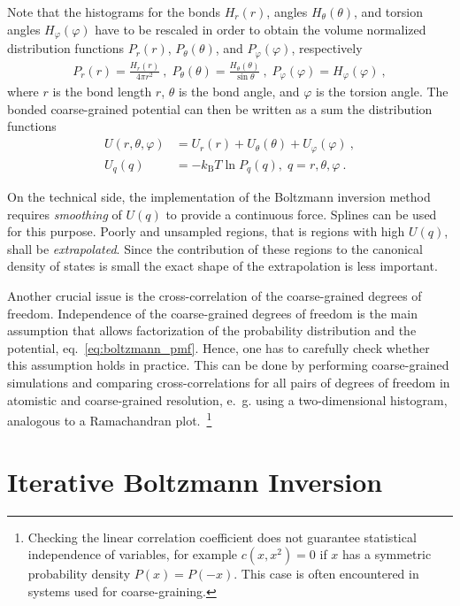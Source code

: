 Note that the histograms for the bonds $H_r(r)$, angles $H_\theta(\theta)$, and torsion angles $H_\varphi(\varphi)$ have to be rescaled in order to obtain the volume normalized distribution functions $P_r(r)$, $P_\theta(\theta)$, and $P_\varphi(\varphi)$, respectively
%
\begin{align}
    P_r(r) = \frac{H_r(r)}{4\pi r^2}~,\;
    P_\theta(\theta) = \frac{H_\theta(\theta)}{\sin \theta}~,\;
    P_\varphi(\varphi) = H_\varphi (\varphi)~,
    \label{eq:boltzmann_norm}
\end{align}
where $r$ is the bond length $r$, $\theta$ is the bond angle, and $\varphi$ is the torsion angle. The bonded coarse-grained potential can then be written as a sum the distribution functions
%
\begin{align}
    \label{eq:boltzmann_pmf}
    U({r}, \theta, \varphi) &= U_r({r}) + U_{\theta}(\theta) + U_{\varphi}(\varphi)~, \\
    U_q({q}) &= - k_\text{B} T \ln P_q( q ),\; q=r, \theta, \varphi~.
    \nonumber
\end{align}

On the technical side, the implementation of the Boltzmann inversion method requires {\em smoothing} of $U(q)$ to provide a continuous force. Splines can be used for this purpose. Poorly and unsampled regions, that is regions with high $U(q)$, shall be {\em extrapolated}. Since the contribution of these regions to the canonical density of states is small the exact shape of the extrapolation is less important.

Another crucial issue is the cross-correlation of the coarse-grained degrees of freedom. Independence of the coarse-grained degrees of freedom is the main assumption that allows factorization of the probability distribution and the potential, eq.~\ref{eq:boltzmann_pmf}. Hence, one has to carefully check whether this assumption holds in practice. This can be done by performing coarse-grained simulations and comparing cross-correlations for all pairs of degrees of freedom in atomistic and coarse-grained resolution, e.~g. using a two-dimensional histogram, analogous to a Ramachandran plot.~\footnote{Checking the linear correlation coefficient does not guarantee statistical independence of variables, for example $c(x, x^2)=0$ if $x$ has a symmetric probability density $P(x) = P(-x)$. This case is often encountered in systems used for coarse-graining.}


\section{Iterative Boltzmann Inversion}
\label{sec:ibi}

